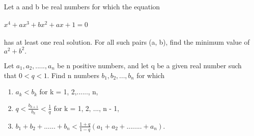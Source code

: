 


\item Let a and b be real numbers for which the equation \\
\\$x^4 + ax^3 + bx^2 + ax + 1 = 0$ \\
\\has at least one real solution. For all such pairs (a, b), find the minimum value of $a^2 + b^2.$\\

\item Let $a_1, a_2,....., a_n$ be n positive numbers, and let q be a given real number such that $0 < q < 1.$ Find n numbers $b_1, b_2, ..., b_n$ for which\\
\begin{enumerate}
\item $a_k < b_k$ for k = 1, 2,......, n,
\item  $q < \frac{b_{k+1}}{b_k} < \frac{1}{q}$ for k = 1, 2, ..., n - 1,
\item $b_1 + b_2 + ...... + b_n < \frac{1+q}{1-q}(a_1 + a_2 +........ + a_n).$
\end{enumerate}


